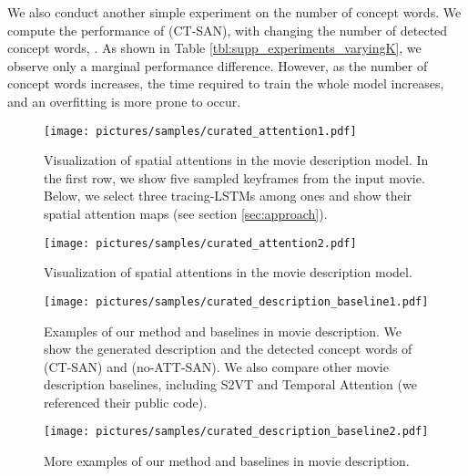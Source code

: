 \documentclass[10pt,twocolumn,letterpaper]{article}
\theoremstyle{nonumberplain}
\begin{document}
We also conduct another simple experiment on the number of concept words.
We compute the performance of (CT-SAN), with changing the number of detected concept words, .
As shown in Table \ref{tbl:supp_experiments_varyingK},
we observe only a marginal performance difference.
However, as the number of concept words increases,
the time required to train the whole model increases,
and an overfitting is more prone to occur.




\begin{figure*}[p]
\centering
\texttt{[image: pictures/samples/curated\_attention1.pdf]}
\vspace{10pt}
\caption{Visualization of spatial attentions in the movie description model.
    In the first row, we show five sampled keyframes from the input movie.
    Below, we select three tracing-LSTMs among  ones and show their spatial attention maps  (see section \ref{sec:approach}).
}
\label{fig:example_attention1}
\vspace{-5pt}
\end{figure*}

\begin{figure*}[p]
\centering
\texttt{[image: pictures/samples/curated\_attention2.pdf]}
\vspace{10pt}
\caption{Visualization of spatial attentions in the movie description model.
}
\label{fig:example_attention2}
\vspace{-5pt}
\end{figure*}




\begin{figure*}[p]
\centering
\texttt{[image: pictures/samples/curated\_description\_baseline1.pdf]}
\caption{Examples of our method and baselines in movie description.
    We show the generated description and the detected concept words of (CT-SAN) and (no-ATT-SAN).
    We also compare other movie description baselines, including
    S2VT \cite{venugopalan-iccv-2015} and Temporal Attention \cite{yao-iccv-2015} (we referenced their public code).
}
\label{fig:example_baseline1}
\vspace{-5pt}
\end{figure*}

\begin{figure*}[p]
\centering
\texttt{[image: pictures/samples/curated\_description\_baseline2.pdf]}
\caption{More examples of our method and baselines in movie description.
}
\label{fig:example_baseline2}
\vspace{-5pt}
\end{figure*}
\end{document}
